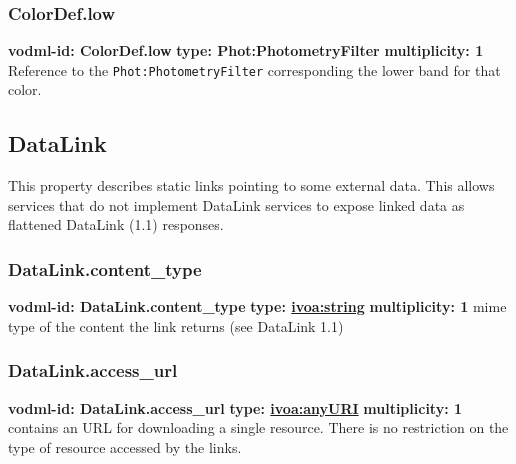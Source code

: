     \subsubsection{ColorDef.low}
      \textbf{vodml-id: ColorDef.low} \newline
      \textbf{type: Phot:PhotometryFilter} \newline
      \textbf{multiplicity: 1} \newline
      Reference to the \texttt{Phot:PhotometryFilter} corresponding the lower band for that color.

  \subsection{DataLink}
  \label{sect:DataLink}
    This property describes static links pointing to some external data. This allows services that do not implement DataLink services to expose linked data as flattened DataLink (1.1) responses.

    \subsubsection{DataLink.content\_type}
      \textbf{vodml-id: DataLink.content\_type} \newline
      \textbf{type: \hyperref[sect:ivoa]{ivoa:string}} \newline
      \textbf{multiplicity: 1} \newline
      mime type of the content the link returns (see DataLink 1.1)

    \subsubsection{DataLink.access\_url}
      \textbf{vodml-id: DataLink.access\_url} \newline
      \textbf{type: \hyperref[sect:ivoa]{ivoa:anyURI}} \newline
      \textbf{multiplicity: 1} \newline
      contains an URL for downloading a single resource. There is no restriction on the type of resource accessed by the links.

